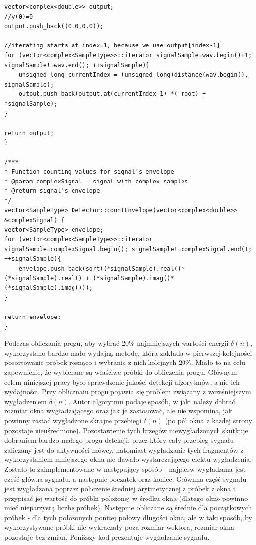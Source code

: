 \documentclass[eng,printmode]{mgr}
\begin{document}
\begin{lstlisting}
vector<complex<double>> output;
//y(0)=0
output.push_back((0.0,0.0));

//iterating starts at index=1, because we use output[index-1]
for (vector<complex<SampleType>>::iterator signalSample=wav.begin()+1; signalSample!=wav.end(); ++signalSample){
	unsigned long currentIndex = (unsigned long)distance(wav.begin(), signalSample);
	output.push_back(output.at(currentIndex-1) *(-root) + *signalSample);
}

return output;
}

/***
* Function counting values for signal's envelope
* @param complexSignal - signal with complex samples
* @return signal's envelope
*/
vector<SampleType> Detector::countEnvelope(vector<complex<double>> &complexSignal) {
vector<SampleType> envelope;
for (vector<complex<SampleType>>::iterator signalSample=complexSignal.begin(); signalSample!=complexSignal.end(); ++signalSample){
	envelope.push_back(sqrt((*signalSample).real()*(*signalSample).real() + (*signalSample).imag()*(*signalSample).imag()));
}

return envelope;
}

\end{lstlisting}\vspace{5mm}


 Podczas obliczania progu, aby wybrać 20\% najmniejszych wartości energii $\delta(n)$, wykorzystano bardzo mało wydajną metodę, która zakłada w pierwszej kolejności posortowanie próbek rosnąco i wybranie z nich kolejnych 20\%. Miało to na celu zapewnienie, że wybierane są właściwe próbki do obliczenia progu. Głównym celem niniejszej pracy było  sprawdzenie jakości detekcji algorytmów, a nie ich wydajności. Przy oblicznaiu progu pojawia się problem związany z wcześniejszym wygładzeniem $\delta(n)$. Autor algorytmu podaje sposób, w jaki należy dobrać rozmiar okna wygładzającego oraz jak je zastosować, ale nie wspomina, jak powinny zostać wygładzone skrajne przebiegi $\delta(n)$ (po pół okna z każdej strony pozostaje nieuśrednione). Pozostawienie tych brzegów niewygładzonych skutkuje dobraniem bardzo małego progu detekcji, przez który cały przebieg sygnału zaliczany jest do aktywności mówcy, natomiast wygładzanie tych fragmentów z wykorzystaniem mniejszego okna nie dawało wystarczającego efektu wygładzenia. Zostało to zaimplementowane w następujący sposób - najpierw wygładzana jest część główna sygnału, a następnie początek oraz koniec. Głównna część sygnału jest wygładzana poprzez policzenie średniej arytmetycznej z próbek z okna i przypisać jej wartość do próbki położonej w środku okna (dlatego okno powinno mieć nieparzystą liczbę próbek). Następnie obliczane są średnie dla początkowych próbek - dla tych połozonych poniżej połowy długości okna, ale w taki sposób, by wykorzystywane próbki nie wykraczały poza rozmiar wektora, rozmiar okna pozostaje bez zmian. Poniższy kod prezentuje wygładzanie sygnału.
\end{document}
